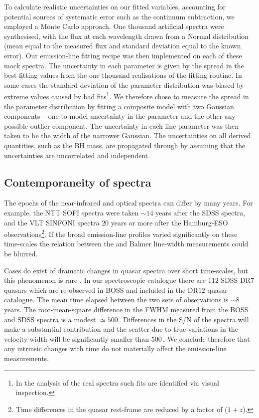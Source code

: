 To calculate realistic uncertainties on our fitted variables, accounting for potential sources of systematic error such as the continuum subtraction, we employed a Monte Carlo approach.
One thousand artificial spectra were synthesised, with the flux at each wavelength drawn from a Normal distribution (mean equal to the measured flux and standard deviation equal to the known error).
Our emission-line fitting recipe was then implemented on each of these mock spectra.
The uncertainty in each parameter is given by the spread in the best-fitting values from the one thousand realisations of the fitting routine.
In some cases the standard deviation of the parameter distribution was biased by extreme values caused by bad fits\footnote{In the analysis of the real spectra such fits are identified via visual inspection.}.
We therefore chose to measure the spread in the parameter distribution by fitting a composite model with two Gaussian components -- one to model uncertainty in the parameter and the other any possible outlier component.
The uncertainty in each line parameter was then taken to be the width of the narrower Gaussian.
The uncertainties on all derived quantities, such as the BH mass, are propagated through by assuming that the uncertainties are uncorrelated and independent.

\subsection{Contemporaneity of spectra}

The epochs of the near-infrared and optical spectra can differ by many years.
For example, the NTT SOFI spectra were taken $\sim14$ years after the SDSS spectra, and the VLT SINFONI spectra $20$ years or more after the Hamburg-ESO observations\footnote{Time differences in the quasar rest-frame are reduced by a factor of ($1 + z$).}.
If the broad emission-line profiles varied significantly on these time-scales the relation between the  and Balmer line-width measurements could be blurred.

Cases do exist of dramatic changes in quasar spectra over short time-scales, but this phenomenon is rare \citep{macleod16}.
In our spectroscopic catalogue there are $112$ SDSS DR$7$ quasars which are re-observed in BOSS and included in the DR$12$ quasar catalogue.
The mean time elapsed between the two sets of observations is $\sim8$ years.
The root-mean-square difference in the  FWHM measured from the BOSS and SDSS spectra is a modest $\simeq500$\,\kms.
Differences in the S/N of the spectra will make a substantial contribution and the scatter due to true variations in the  velocity-width will be significantly smaller than $500$\,\kms.
We conclude therefore that any intrinsic changes with time do not materially affect the emission-line measurements.

